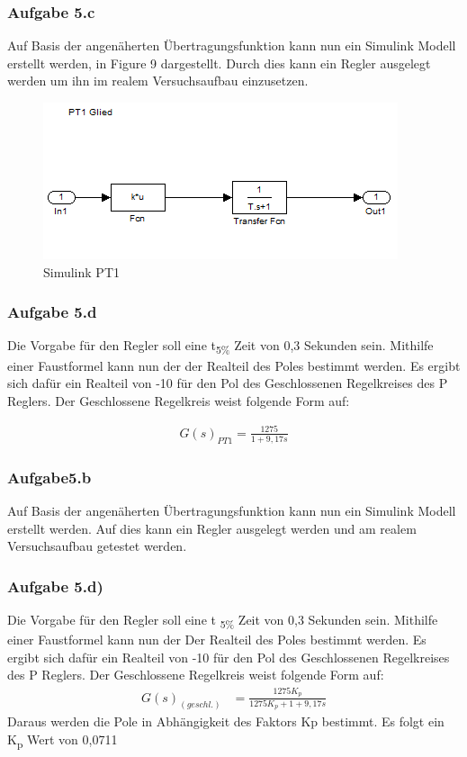 \documentclass[10pt]{scrartcl}
\begin{document}
\subsubsection{Aufgabe 5.c}
Auf Basis der angenäherten Übertragungsfunktion kann nun ein Simulink Modell erstellt werden, in Figure 9 dargestellt. Durch dies kann ein Regler ausgelegt werden um ihn im realem Versuchsaufbau einzusetzen.\\

\begin{figure}
  \includegraphics[scale=0.51]{Leon-PRT-Bilder/Drehzahl5cklein}
  \caption{Simulink PT1}
\end{figure}
\subsubsection{Aufgabe 5.d}
Die Vorgabe für den Regler soll eine t\textsubscript{5\%} Zeit von 0,3 Sekunden sein. Mithilfe einer Faustformel kann nun der der Realteil des Poles bestimmt werden. Es ergibt sich dafür ein Realteil von -10 für den Pol des Geschlossenen Regelkreises des P Reglers. Der Geschlossene Regelkreis weist folgende Form auf: 	

\begin{align}
   G(s)_{PT1}=\frac{1275}{1+9,17s}
\end{align}
\subsubsection{Aufgabe5.b}
Auf Basis der angenäherten Übertragungsfunktion kann nun ein Simulink Modell erstellt werden. Auf dies kann ein Regler ausgelegt werden und am realem Versuchsaufbau getestet werden.
\subsubsection{Aufgabe 5.d)}	
Die Vorgabe für den Regler soll eine t \textsubscript{5\%} Zeit von 0,3 Sekunden sein. Mithilfe einer Faustformel kann nun der Der Realteil des Poles bestimmt werden. Es ergibt sich dafür ein Realteil von -10 für den Pol des Geschlossenen Regelkreises des P Reglers. Der Geschlossene Regelkreis weist folgende Form auf:
\begin{align}
G(s)_{(geschl.)}&=\frac{1275K_p}{1275K_p+ 1+9,17s}
\end{align}
Daraus werden die Pole in Abhängigkeit des Faktors Kp bestimmt. Es folgt ein K\textsubscript{p} Wert von 0,0711 \\
\end{document}
